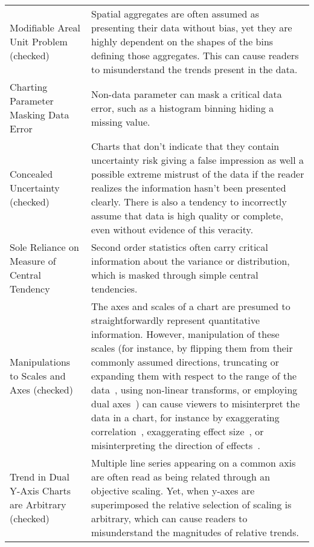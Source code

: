 \begin{longtable}{p{5cm}p{12cm}}
 \rowcolor{colorc}Modifiable Areal Unit Problem (checked) & Spatial aggregates are often assumed as presenting their data without bias, yet they are highly dependent on the shapes of the bins defining those aggregates. This can cause readers to misunderstand the trends present in the data. \cite{fotheringham1991modifiable, kindlmann2014algebraic}\\
 \rowcolor{colorc-opaque}Charting Parameter Masking Data Error & Non-data parameter can mask a critical data error, such as a histogram binning hiding a missing value. \cite{correll2018looks}\\
 \rowcolor{colorc}Concealed Uncertainty (checked) & Charts that don't indicate that they contain uncertainty risk giving a false impression as well a possible extreme mistrust of the data if the reader realizes the information hasn't been presented clearly. There is also a tendency to incorrectly assume that data is high quality or complete, even without evidence of this veracity. \cite{song2018s, few2019loom, mayrTrust2019, sacha2015role}\\
 \rowcolor{colorc-opaque}Sole Reliance on Measure of Central Tendency & Second order statistics often carry critical information about the variance or distribution, which is masked through simple central tendencies.  \cite{wall2017warning, few2019loom, matejka2017same, anscombe1973graphs}\\
 \rowcolor{colorc}Manipulations to Scales and Axes (checked) & The axes and scales of a chart are presumed to straightforwardly represent quantitative information. However, manipulation of these scales (for instance, by flipping them from their commonly assumed directions, truncating or expanding them with respect to the range of the data~\cite{pandey2015deceptive, correll2017black, cleveland1982variables, ritchie2019lie, correll2019truncating}, using non-linear transforms, or employing dual axes~\cite{KindlmannAlgebraicVisPedagogyPDV2016, cairo2015graphics}) can cause viewers to misinterpret the data in a chart, for instance by exaggerating correlation~\cite{cleveland1982variables}, exaggerating effect size~\cite{correll2019truncating,pandey2015deceptive}, or misinterpreting the direction of effects~\cite{pandey2015deceptive}. \cite{cairo2015graphics,correll2017black,correll2019truncating,cleveland1982variables,KindlmannAlgebraicVisPedagogyPDV2016,pandey2015deceptive,ritchie2019lie}\\
 \rowcolor{colorc-opaque}Trend in Dual Y-Axis Charts are Arbitrary (checked) & Multiple line series appearing on a common axis are often read as being related through an objective scaling. Yet, when y-axes are superimposed the relative selection of scaling is arbitrary, which can cause readers to misunderstand the magnitudes of relative trends. \cite{KindlmannAlgebraicVisPedagogyPDV2016, cairo2015graphics}\\

\end{longtable}

